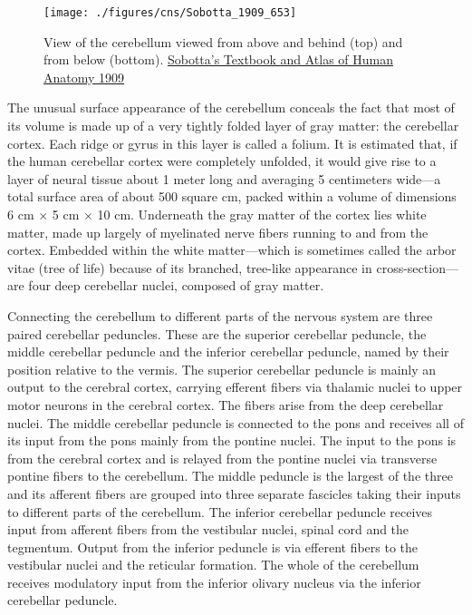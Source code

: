 \begin{figure}

{\centering \texttt{[image: ./figures/cns/Sobotta\_1909\_653]} 

}

\caption{View of the cerebellum viewed from above and behind (top) and from below (bottom). \href{https://commons.wikimedia.org/wiki/File:Sobo_1909_653.png}{Sobotta's Textbook and Atlas of Human Anatomy 1909}}\label{fig:cerebellumabovebelow}
\end{figure}

The unusual surface appearance of the cerebellum conceals the fact that most of its volume is made up of a very tightly folded layer of gray matter: the cerebellar cortex. Each ridge or gyrus in this layer is called a folium. It is estimated that, if the human cerebellar cortex were completely unfolded, it would give rise to a layer of neural tissue about 1 meter long and averaging 5 centimeters wide---a total surface area of about 500 square cm, packed within a volume of dimensions 6 cm × 5 cm × 10 cm. Underneath the gray matter of the cortex lies white matter, made up largely of myelinated nerve fibers running to and from the cortex. Embedded within the white matter---which is sometimes called the arbor vitae (tree of life) because of its branched, tree-like appearance in cross-section---are four deep cerebellar nuclei, composed of gray matter.

Connecting the cerebellum to different parts of the nervous system are three paired cerebellar peduncles. These are the superior cerebellar peduncle, the middle cerebellar peduncle and the inferior cerebellar peduncle, named by their position relative to the vermis. The superior cerebellar peduncle is mainly an output to the cerebral cortex, carrying efferent fibers via thalamic nuclei to upper motor neurons in the cerebral cortex. The fibers arise from the deep cerebellar nuclei. The middle cerebellar peduncle is connected to the pons and receives all of its input from the pons mainly from the pontine nuclei. The input to the pons is from the cerebral cortex and is relayed from the pontine nuclei via transverse pontine fibers to the cerebellum. The middle peduncle is the largest of the three and its afferent fibers are grouped into three separate fascicles taking their inputs to different parts of the cerebellum. The inferior cerebellar peduncle receives input from afferent fibers from the vestibular nuclei, spinal cord and the tegmentum. Output from the inferior peduncle is via efferent fibers to the vestibular nuclei and the reticular formation. The whole of the cerebellum receives modulatory input from the inferior olivary nucleus via the inferior cerebellar peduncle.



